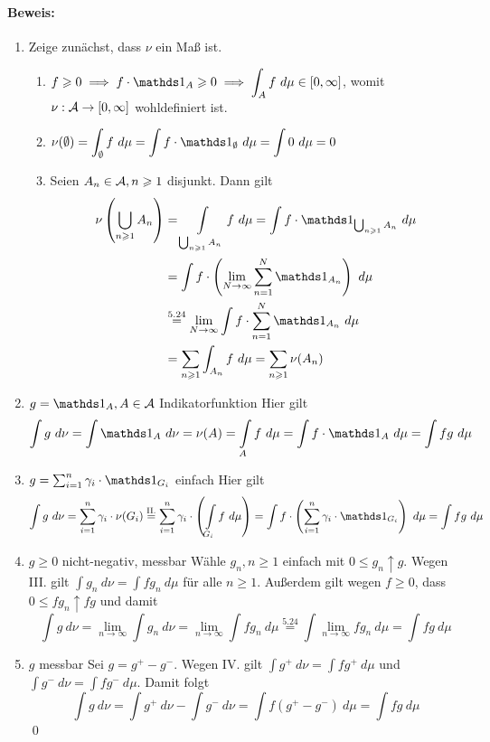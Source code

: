 \documentclass[12pt]{report}
\begin{document}
 \paragraph{Beweis:}
 \begin{enumerate}[label=\Roman*.]
     \item Zeige zun\"achst, dass $\nu$ ein Ma\ss{} ist.\newline
     \begin{enumerate}[label=(\roman*)]
        \item $\displaystyle f\geq0\implies f\cdot\ind{A}\geq0\implies\int_A f\ d\mu\in[0,\infty]$, womit $\nu:\mathcal{A}\to[0,\infty]$ wohldefiniert ist.
        \item $\nu(\emptyset)=\displaystyle\int_\emptyset f\ d\mu=\int f\cdot\ind{\emptyset}\ d\mu=\int 0 \ d\mu=0$
        \item Seien $A_n\in\mathcal{A},n\geqslant1$ disjunkt. Dann gilt
        \begin{align*}
            \nu\left(\bigcup_{n\geq1}A_n\right)&=\int\displaylimits_{\bigcup_{n\geq1}A_n}f\ d\mu=\int f\cdot\ind{\bigcup_{n\geq1}A_n}\ d\mu\\
            &=\int f\cdot\left(\lim_{N\to\infty}\sum_{n=1}^N\ind{A_n}\right)\ d\mu\\
            &\overset{5.24}{=}\lim_{N\to\infty}\int f\cdot\sum_{n=1}^N\ind{A_n}\ d\mu\\
            &=\sum_{n\geq1}\int_{A_n} f\ d\mu=\sum_{n\geq1}\nu(A_n)
        \end{align*}
     \end{enumerate}
     \item $g=\ind{A},A\in\A$ Indikatorfunktion\newline
     Hier gilt
     $$\int g\ d\nu=\int \ind{A}\ d\nu=\nu(A)=\int\displaylimits_{A} f\ d\mu=\int f\cdot\ind{A}\ d\mu=\int fg\ d\mu$$
     \item $g=\sum_{i=1}^n\gamma_i\cdot\ind{G_i}$ einfach\newline
     Hier gilt
     \begin{align*}
         \int g\ d\nu=\sum_{i=1}^n\gamma_i\cdot\nu(G_i)\overset{\text{II.}}{=}\sum_{i=1}^n\gamma_i\cdot\left(\int\displaylimits_{G_i}f\ d\mu\right)=\int f\cdot\left(\sum_{i=1}^n\gamma_i\cdot\ind{G_i}\right)\ d\mu=\int fg\ d\mu
     \end{align*}
     \item $g\geq0$ nicht-negativ, messbar\newline
     W\"ahle $g_n,n\geq1$ einfach mit $0\leq g_n\uparrow g$. Wegen III. gilt $\displaystyle\int g_n\ d\nu=\int fg_n\ d\mu$ f\"ur alle $n\geq1$. Au\ss{}erdem gilt wegen $f\geq0$, dass $0\leq fg_n\uparrow fg$ und damit
     $$\int g \ d\nu=\lim_{n\to\infty}\int g_n\ d\nu=\lim_{n\to\infty}\int fg_n\ d\mu\overset{5.24}{=}\int \lim_{n\to\infty}fg_n\ d\mu=\int fg\ d\mu$$
     \item $g$ messbar\newline
     Sei $g=g^+-g^-$. Wegen IV. gilt $\displaystyle\int g^+\ d\nu=\int fg^+\ d\mu$ und $\displaystyle\int g^-\ d\nu=\int fg^-\ d\mu$. Damit folgt
     $$\int g\ d\nu=\int g^+\ d\nu-\int g^-\ d\nu=\int f(g^+-g^-)\ d\mu=\int fg\ d\mu$$
     \qed
 \end{enumerate}
 
\end{document}
